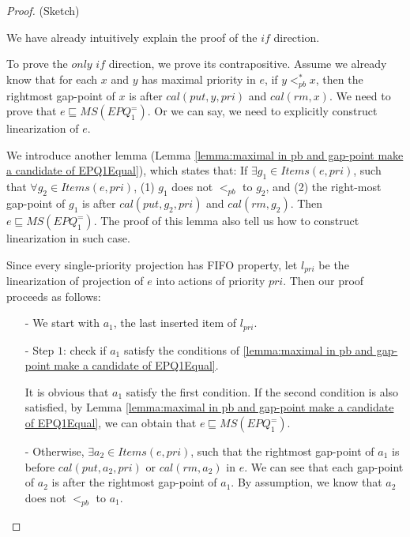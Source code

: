 \begin {proof} (Sketch)

We have already intuitively explain the proof of the $\textit{if}$ direction.

To prove the $\textit{only if}$ direction, we prove its contrapositive. Assume we already know that for each $x$ and $y$ has maximal priority in $e$, if $y <_{\textit{pb}}^* x$, then the rightmost gap-point of $x$ is after $\textit{cal}(\textit{put},y,\textit{pri})$ and $\textit{cal}(\textit{rm},x)$. We need to prove that $e \sqsubseteq \textit{MS}(\textit{EPQ}_1^{=})$. Or we can say, we need to explicitly construct linearization of $e$.

We introduce another lemma (Lemma \ref{lemma:maximal in pb and gap-point make a candidate of EPQ1Equal}), which states that: If $\exists g_1 \in \textit{Items}(e,\textit{pri})$, such that $\forall g_2 \in \textit{Items}(e,\textit{pri})$, (1) $g_1$ does not $<_{\textit{pb}}$ to $g_2$, and (2) the right-most gap-point of $g_1$ is after $\textit{cal}(\textit{put},g_2,\textit{pri})$ and $\textit{cal}(\textit{rm},g_2)$. Then $e \sqsubseteq \textit{MS}(\textit{EPQ}_1^{=})$. The proof of this lemma also tell us how to construct linearization in such case.

Since every single-priority projection has FIFO property, let $l_{\textit{pri}}$ be the linearization of projection of $e$ into actions of priority $\textit{pri}$. Then our proof proceeds as follows:


\begin{itemize}
\setlength{\itemsep}{0.5pt}
\item[-] We start with $a_1$, the last inserted item of $l_{\textit{pri}}$.

\item[-] Step $1$: check if $a_1$ satisfy the conditions of \ref{lemma:maximal in pb and gap-point make a candidate of EPQ1Equal}.

    It is obvious that $a_1$ satisfy the first condition. If the second condition is also satisfied, by Lemma \ref{lemma:maximal in pb and gap-point make a candidate of EPQ1Equal}, we can obtain that $e \sqsubseteq \textit{MS}(\textit{EPQ}_1^{=})$.

\item[-] Otherwise, $\exists a_2 \in \textit{Items}(e,\textit{pri})$, such that the rightmost gap-point of $a_1$ is before $\textit{cal}(\textit{put},a_2,\textit{pri})$ or $\textit{cal}(\textit{rm},a_2)$ in $e$. We can see that each gap-point of $a_2$ is after the rightmost gap-point of $a_1$. By assumption, we know that $a_2$ does not $<_{\textit{pb}}$ to $a_1$.


\end{itemize}
\end{proof}
